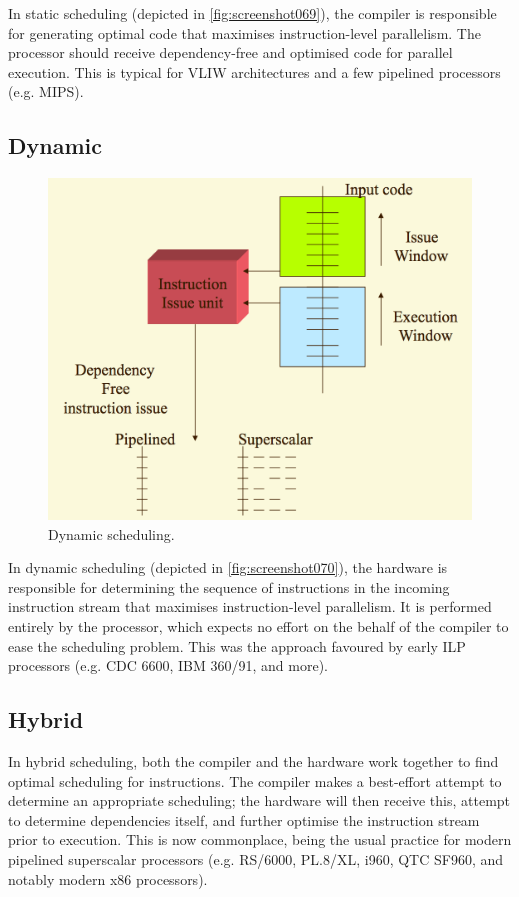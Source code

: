 In static scheduling (depicted in \autoref{fig:screenshot069}), the compiler is responsible for generating optimal code that maximises instruction-level parallelism. The processor should receive dependency-free and optimised code for parallel execution. This is typical for VLIW architectures and a few pipelined processors (e.g. MIPS).

\subsection{Dynamic}
\begin{figure}
\centering
\includegraphics[width=0.7\linewidth]{figures/screenshot070}
\caption{Dynamic scheduling.}
\label{fig:screenshot070}
\end{figure}
In dynamic scheduling (depicted in \autoref{fig:screenshot070}), the hardware is responsible for determining the sequence of instructions in the incoming instruction stream that maximises instruction-level parallelism. It is performed entirely by the processor, which expects no effort on the behalf of the compiler to ease the scheduling problem. This was the approach favoured by early ILP processors (e.g. CDC 6600, IBM 360/91, and more).

\subsection{Hybrid}
In hybrid scheduling, both the compiler and the hardware work together to find optimal scheduling for instructions. The compiler makes a best-effort attempt to determine an appropriate scheduling; the hardware will then receive this, attempt to determine dependencies itself, and further optimise the instruction stream prior to execution. This is now commonplace, being the usual practice for modern pipelined superscalar processors (e.g. RS/6000, PL.8/XL, i960, QTC SF960, and notably modern x86 processors). 


